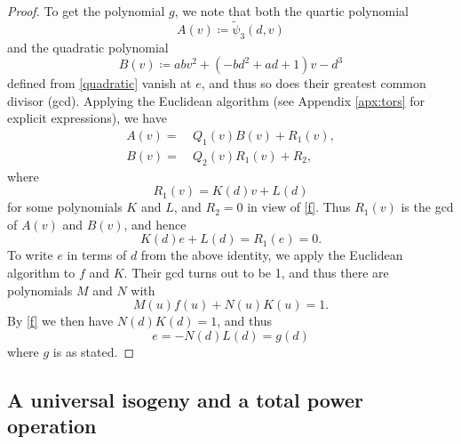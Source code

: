 \documentclass{gtpart}
\theoremstyle{definition}
\theoremstyle{remark}
\newcommand{\Tp}{\widetilde{\psi}}
\begin{document}
\begin{proof}
 To get the polynomial $g$, we note that both the quartic polynomial 
 \[
  A(v) \coloneqq \Tp_3(d,v) 
 \]
 and the quadratic polynomial 
 \[
  B(v) \coloneqq a b v^2 + (-b d^2 + a d + 1) v - d^3 
 \]
 defined from \eqref{quadratic} vanish at $e$, and thus so does their 
 greatest common divisor (gcd).  Applying the Euclidean algorithm (see 
 Appendix \ref{apx:tors} for explicit expressions), we have 
 \begin{equation*}
 \begin{split}
  A(v) = & ~ Q_1(v) B(v) + R_1(v), \\
  B(v) = & ~ Q_2(v) R_1(v) + R_2, 
 \end{split}
 \end{equation*}
 where 
 \[
  R_1(v) = K(d) v + L(d) 
 \]
 for some polynomials $K$ and $L$, and $R_2 = 0$ in view of \eqref{f}.  
 Thus $R_1(v)$ is the gcd of $A(v)$ and $B(v)$, and hence 
 \[
  K(d) e + L(d) = R_1(e) = 0.  
 \]
 To write $e$ in terms of $d$ from the above identity, we apply the 
 Euclidean algorithm to $f$ and $K$.  Their gcd turns out to be 1, and 
 thus there are polynomials $M$ and $N$ with 
 \[
  M(u) f(u) + N(u) K(u) = 1.  
 \]
 By \eqref{f} we then have $N(d) K(d) = 1$, and thus 
 \[
  e = -N(d) L(d) = g(d) 
 \]
 where $g$ is as stated.  
\end{proof}


\subsection{A universal isogeny and a total power operation}
\end{document}
